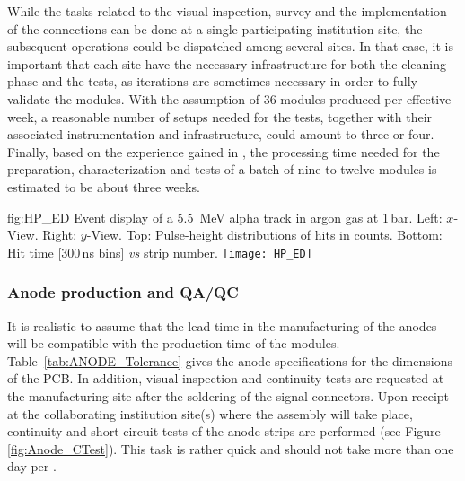 While the tasks related to the  visual inspection, survey and the implementation of the   connections can be done at a single participating institution %
site, the subsequent operations could be dispatched among several sites. In that case, it is  important that each %
site %
have the necessary infrastructure for 
both the cleaning phase and the  tests, as iterations are sometimes necessary in order to fully validate the 
 modules. With the assumption of \num{36}  modules produced per effective week, a reasonable number of setups needed for the   tests, together with their associated instrumentation and infrastructure, could amount to three or four. Finally, based on the experience gained in  , the processing time needed for the preparation, characterization and tests of a batch of nine to twelve  modules is estimated to be about three weeks.  
\begin{dunefigure}
{fig:HP_ED}
{Event display of a \SI{5.5}{MeV} alpha track in argon gas at \num{1}\,bar.  Left: $x$-View. Right: $y$-View. Top: Pulse-height distributions of hits in  counts. Bottom: Hit time [300\,ns bins] \textit{vs} strip number.}
\texttt{[image: HP\_ED]}
\end{dunefigure}
\subsubsection{Anode production and QA/QC}
\label{sec:dp-crp-ANODEprod}
It is realistic to assume that the lead time in the manufacturing of the anodes will be compatible with the production time
of the  modules. Table~\ref{tab:ANODE_Tolerance} gives the anode specifications for the dimensions of the PCB. In addition, visual inspection and continuity tests are requested at the manufacturing site after the soldering of the signal connectors. Upon receipt at the collaborating institution site(s) where the  assembly will take place, continuity and short circuit tests of the anode strips are performed (see Figure \ref{fig:Anode_CTest}). This task is rather quick and should not take more than one day per .  


